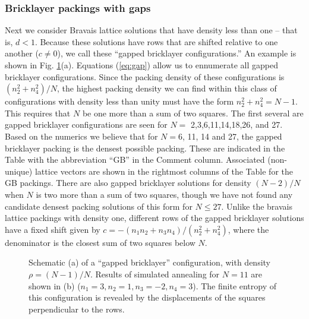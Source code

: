\documentclass[preprint,aps]{revtex4}
\begin{document}

\subsubsection{Bricklayer packings with gaps}
\label{sec:bricklayer}
Next we consider Bravais lattice solutions that have density less than one -- that is, $d < 1$.  Because these solutions have rows that are shifted relative to one another ($c\neq 0$), we call these ``gapped bricklayer configurations.''  An example is shown in Fig. \ref{fig:gb}(a).  Equations (\ref{eq:gap}) allow us to ennumerate all gapped bricklayer configurations. Since the packing density of these configurations is $(n_2^2 + n_4^2)/N$, the highest packing density we can find within this class of configurations with density less than unity must have the form $n_2^2 + n_4^2 = N-1$.  This requires that $N$ be one more than a sum of two squares. The first several are gapped bricklayer configurations are seen for $N=$ 2,3,6,11,14,18,26, and 27.  Based on the numerics we believe that for $N=6$, 11, 14 and 27, the gapped bricklayer packing is the densest possible packing. These are indicated in the Table with the abbreviation ``GB'' in the Comment column. Associated (non-unique) lattice vectors are shown in the rightmost columns of the Table for the GB packings.  There are also gapped bricklayer solutions for density $(N-2)/N$ when $N$ is two more than a sum of two squares, though we have not found any candidate densest packing solutions of this form for $N \leq 27$. Unlike the bravais lattice packings with density one, different rows of the gapped bricklayer solutions have a fixed shift given by $c = - (n_1 n_2 + n_3 n_4)/(n_2^2 + n_4^2)$, where the denominator is the closest sum of two squares below $N$. 

\begin{figure}[H]
\caption{\label{fig:gb}Schematic (a) of a ``gapped bricklayer'' configuration, with density $\rho = (N-1)/N$. Results of simulated annealing for $N=11$ are shown in (b) ($n_1=3, n_2=1, n_3=-2, n_4=3$).  The finite entropy of this configuration is revealed by the displacements of the squares perpendicular to the rows.}
\end{figure}
\end{document}
